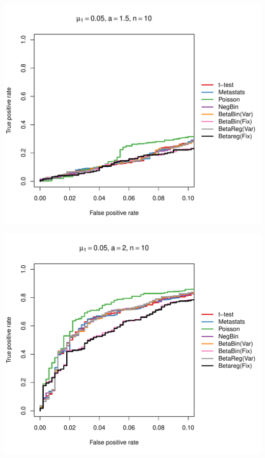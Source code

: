 \documentclass[12pt]{article}\usepackage{graphicx, color}
\makeatletter
\def\maxwidth{ %
  \ifdim\Gin@nat@width>\linewidth
    \linewidth
  \else
    \Gin@nat@width
  \fi
}
\newenvironment{knitrout}{}{} %
\makeatother
\begin{document}
\begin{knitrout}
{\centering \includegraphics[width=\maxwidth]{figure/rocs19} 

}




{\centering \includegraphics[width=\maxwidth]{figure/rocs20} 

}





\end{knitrout}
\end{document}
